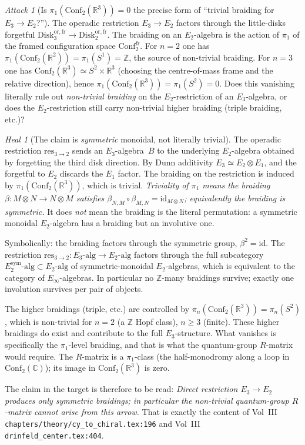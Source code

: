 \documentclass[11pt]{article}
\theoremstyle{definition}
\theoremstyle{remark}
\newtheorem{attack}[thm]{Attack}
\newtheorem{heal}[thm]{Heal}
\newcommand{\bC}{\mathbb{C}}
\newcommand{\bR}{\mathbb{R}}
\newcommand{\bZ}{\mathbb{Z}}
\newcommand{\Eone}{E_1}
\newcommand{\Etwo}{E_2}
\newcommand{\Ethree}{E_3}
\newcommand{\Einf}{E_\infty}
\newcommand{\Conf}{\mathrm{Conf}}
\newcommand{\id}{\mathrm{id}}
\begin{document}
\begin{attack}[Is $\pi_1(\Conf_2(\bR^3)) = 0$ the precise form of
``trivial braiding for $\Ethree \to \Etwo$?'']
\label{att:pi1}
The operadic
restriction $\Ethree \to \Etwo$ factors through the little-disks
forgetful $\mathrm{Disk}^{\mathrm{or,fr}}_3 \to
\mathrm{Disk}^{\mathrm{or,fr}}_2$. The braiding on an $\Etwo$-algebra
is the action of $\pi_1$ of the framed configuration space
$\Conf_2^{\mathrm{fr}}$. For $n = 2$ one has
$\pi_1(\Conf_2(\bR^2)) = \pi_1(S^1) = \bZ$, the source of
non-trivial braiding. For $n = 3$ one has
$\Conf_2(\bR^3) \simeq S^2 \times \bR^3$ (choosing the centre-of-mass
frame and the relative direction), hence $\pi_1(\Conf_2(\bR^3)) =
\pi_1(S^2) = 0$. Does this vanishing literally rule out
\emph{non-trivial braiding} on the $\Etwo$-restriction of an
$\Ethree$-algebra, or does the $\Etwo$-restriction still carry
non-trivial higher braiding (triple braiding, etc.)?
\end{attack}

\begin{heal}[The claim is \emph{symmetric} monoidal, not literally
trivial]
\label{heal:pi1}
The operadic restriction $\mathrm{res}_{3 \to 2}$ sends an
$\Ethree$-algebra~$B$ to the underlying $\Etwo$-algebra obtained
by forgetting the third disk direction. By Dunn additivity
$\Ethree \simeq \Etwo \otimes \Eone$, and the forgetful to
$\Etwo$ discards the $\Eone$ factor. The braiding on the
restriction is induced by $\pi_1(\Conf_2(\bR^3))$, which is
trivial. \emph{Triviality of $\pi_1$ means the braiding
$\beta\colon M \otimes N \to N \otimes M$ satisfies
$\beta_{N,M} \circ \beta_{M,N} = \id_{M \otimes N}$; equivalently
the braiding is \emph{symmetric}.} It does \emph{not} mean the
braiding is the literal permutation: a symmetric monoidal
$\Etwo$-algebra has a braiding but an involutive one.

Symbolically: the braiding factors through the symmetric group,
$\beta^2 = \id$. The restriction
$\mathrm{res}_{3 \to 2}\colon \Ethree\text{-alg} \to
\Etwo\text{-alg}$ factors through the full
subcategory $\Etwo^{\mathrm{sym}}\text{-alg} \subset
\Etwo\text{-alg}$ of symmetric-monoidal $\Etwo$-algebras, which
is equivalent to the category of $\Einf$-algebras. In particular
no $\bZ$-many braidings survive; exactly one involution
survives per pair of objects.

The higher braidings (triple, etc.) are controlled by
$\pi_n(\Conf_2(\bR^3)) = \pi_n(S^2)$, which is non-trivial for
$n = 2$ (a $\bZ$ Hopf class), $n \geq 3$ (finite). These higher
braidings do exist and contribute to the full $\Ethree$-structure.
What vanishes is specifically the $\pi_1$-level braiding, and that
is what the quantum-group $R$-matrix would require. The
$R$-matrix is a $\pi_1$-class (the half-monodromy along a loop
in $\Conf_2(\bC)$); its image in $\Conf_2(\bR^3)$ is zero.

The claim in the target is therefore to be read:
\textit{Direct restriction $\Ethree \to \Etwo$ produces only
symmetric braidings; in particular the non-trivial quantum-group
$R$-matrix cannot arise from this arrow.} That is exactly the
content of Vol~III
\texttt{chapters/theory/cy\_to\_chiral.tex:196} and Vol~III
\texttt{drinfeld\_center.tex:404}.
\end{heal}
\end{document}

